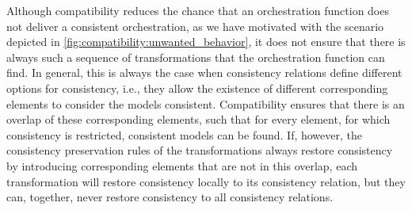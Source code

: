 Although compatibility reduces the chance that an orchestration function does not deliver a consistent orchestration, as we have motivated with the scenario depicted in \autoref{fig:compatibility:unwanted_behavior}, it does not ensure that there is always such a sequence of transformations that the orchestration function can find.
In general, this is always the case when consistency relations define different options for consistency, i.e., they allow the existence of different corresponding elements to consider the models consistent.
Compatibility ensures that there is an overlap of these corresponding elements, such that for every element, for which consistency is restricted, consistent models can be found.
If, however, the consistency preservation rules of the transformations always restore consistency by introducing corresponding elements that are not in this overlap, each transformation will restore consistency locally to its consistency relation, but they can, together, never restore consistency to all consistency relations.


